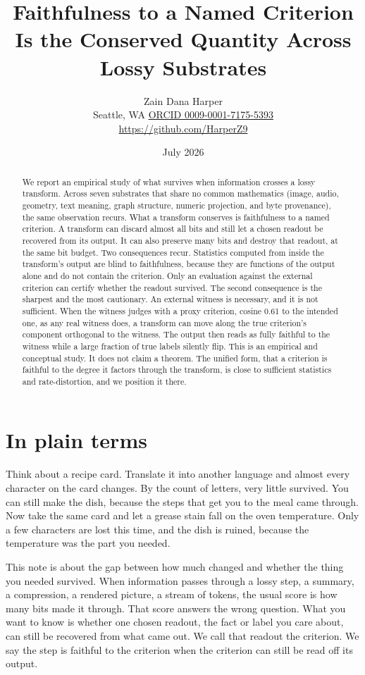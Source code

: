 \documentclass[11pt]{article}
\title{\textbf{Faithfulness to a Named Criterion Is the Conserved Quantity Across Lossy Substrates}}
\author{Zain Dana Harper\\[2pt]\small Seattle, WA \quad\textbar\quad \href{https://orcid.org/0009-0001-7175-5393}{ORCID 0009-0001-7175-5393}\\[2pt]\small\url{https://github.com/HarperZ9}}
\date{July 2026}
\begin{document}
\maketitle
\begin{abstract}
We report an empirical study of what survives when information crosses a lossy transform. Across seven substrates that share no common mathematics (image, audio, geometry, text meaning, graph structure, numeric projection, and byte provenance), the same observation recurs. What a transform conserves is faithfulness to a named criterion. A transform can discard almost all bits and still let a chosen readout be recovered from its output. It can also preserve many bits and destroy that readout, at the same bit budget. Two consequences recur. Statistics computed from inside the transform's output are blind to faithfulness, because they are functions of the output alone and do not contain the criterion. Only an evaluation against the external criterion can certify whether the readout survived. The second consequence is the sharpest and the most cautionary. An external witness is necessary, and it is not sufficient. When the witness judges with a proxy criterion, cosine 0.61 to the intended one, as any real witness does, a transform can move along the true criterion's component orthogonal to the witness. The output then reads as fully faithful to the witness while a large fraction of true labels silently flip. This is an empirical and conceptual study. It does not claim a theorem. The unified form, that a criterion is faithful to the degree it factors through the transform, is close to sufficient statistics and rate-distortion, and we position it there.
\end{abstract}

\section*{In plain terms}
Think about a recipe card. Translate it into another language and almost every character on the card changes. By the count of letters, very little survived. You can still make the dish, because the steps that get you to the meal came through. Now take the same card and let a grease stain fall on the oven temperature. Only a few characters are lost this time, and the dish is ruined, because the temperature was the part you needed.

This note is about the gap between how much changed and whether the thing you needed survived. When information passes through a lossy step, a summary, a compression, a rendered picture, a stream of tokens, the usual score is how many bits made it through. That score answers the wrong question. What you want to know is whether one chosen readout, the fact or label you care about, can still be recovered from what came out. We call that readout the criterion. We say the step is faithful to the criterion when the criterion can still be read off its output.
\end{document}
